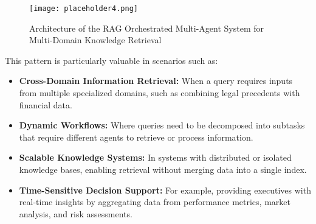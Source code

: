 \documentclass[12pt]{article}
\begin{document}
\begin{figure}[h!]
    \centering
    \texttt{[image: placeholder4.png]}
    \caption{Architecture of the RAG Orchestrated Multi-Agent System for Multi-Domain Knowledge Retrieval}
    \label{fig:multi_agent_system}
\end{figure}

\newpage

This pattern is particularly valuable in scenarios such as:
\begin{itemize}
    \item \textbf{Cross-Domain Information Retrieval:} When a query requires inputs from multiple specialized domains, such as combining legal precedents with financial data.
    \item \textbf{Dynamic Workflows:} Where queries need to be decomposed into subtasks that require different agents to retrieve or process information.
    \item \textbf{Scalable Knowledge Systems:} In systems with distributed or isolated knowledge bases, enabling retrieval without merging data into a single index.
    \item \textbf{Time-Sensitive Decision Support:} For example, providing executives with real-time insights by aggregating data from performance metrics, market analysis, and risk assessments.
\end{itemize}
\end{document}
